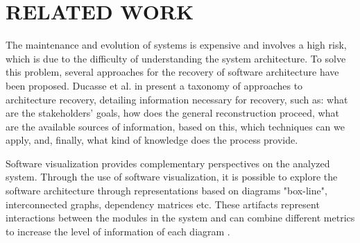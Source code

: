 \documentclass{sig-alternate-05-2015}
\begin{document}


%
%

%
%
\printccsdesc





\section{RELATED WORK}%



The maintenance and evolution of systems is expensive and involves a high risk, which is due to the difficulty of understanding the system architecture. To solve this problem, several approaches for the recovery of software architecture have been proposed. Ducasse et al. in \cite{ducasse_software_2009} present a taxonomy of approaches to architecture recovery, detailing information necessary for recovery, such as: what are the stakeholders’ goals, how does the general reconstruction proceed, what are the available sources of information, based on this, which techniques can we apply, and, finally, what kind of knowledge does the process provide.

Software visualization provides complementary perspectives on the analyzed system. Through the use of software visualization, it is possible to explore the software architecture through representations based on diagrams "box-line", interconnected graphs, dependency matrices etc. These artifacts represent interactions between the modules in the system and can combine different metrics to increase the level of information of each diagram \cite{ lungu_lanza_2007}.
\end{document}
